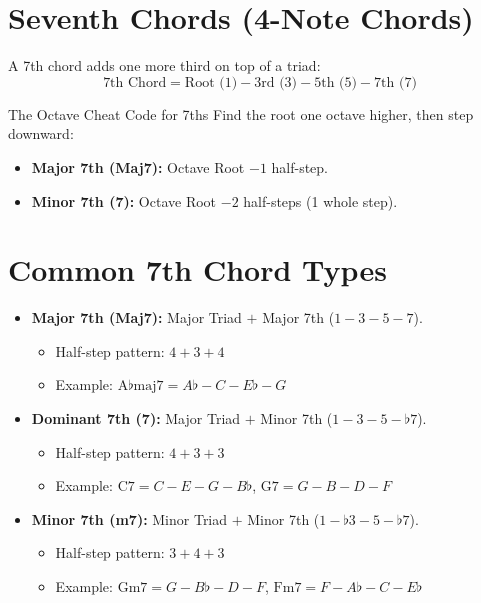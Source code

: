 
\section{Seventh Chords (4-Note Chords)}

A 7th chord adds one more third on top of a triad:
\begin{equation*}
    \text{7th Chord} = \text{Root (1)} - \text{3rd (3)} - \text{5th (5)} - \text{7th (7)}
\end{equation*}

\begin{examplebox}{The Octave Cheat Code for 7ths}
Find the root one octave higher, then step downward:
\begin{itemize}
    \item \textbf{Major 7th (Maj7):} Octave Root $- 1$ half-step.
    \item \textbf{Minor 7th (7):} Octave Root $- 2$ half-steps (1 whole step).
\end{itemize}
\end{examplebox}

\section{Common 7th Chord Types}

\begin{itemize}
    \item \textbf{Major 7th (Maj7):} Major Triad $+$ Major 7th ($1 - 3 - 5 - 7$).
    \begin{itemize}
        \item Half-step pattern: $4 + 3 + 4$
        \item Example: $\text{A}\flat\text{maj7} = A\flat - C - E\flat - G$
    \end{itemize}
    \item \textbf{Dominant 7th (7):} Major Triad $+$ Minor 7th ($1 - 3 - 5 - \flat 7$).
    \begin{itemize}
        \item Half-step pattern: $4 + 3 + 3$
        \item Example: $\text{C7} = C - E - G - B\flat$, $\text{G7} = G - B - D - F$
    \end{itemize}
    \item \textbf{Minor 7th (m7):} Minor Triad $+$ Minor 7th ($1 - \flat 3 - 5 - \flat 7$).
    \begin{itemize}
        \item Half-step pattern: $3 + 4 + 3$
        \item Example: $\text{Gm7} = G - B\flat - D - F$, $\text{Fm7} = F - A\flat - C - E\flat$
    \end{itemize}
\end{itemize}

